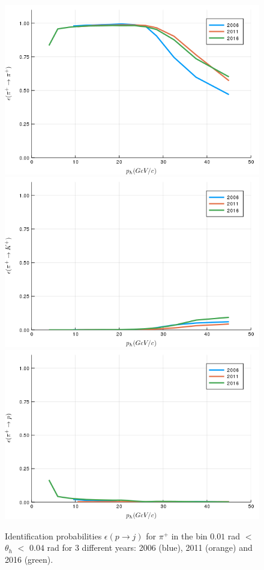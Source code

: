 \begin{figure}[!h]
  \centering
	\includegraphics[scale=0.35]{./gfx/t1/pip2pip.png}
  \includegraphics[scale=0.35]{./gfx/t1/pip2kp.png}
  \includegraphics[scale=0.35]{./gfx/t1/pip2pp.png}
	\caption{Identification probabilities $\epsilon(p \rightarrow j)$ for $\pi^+$ in the bin $0.01$ rad $<$ $\theta_h$ $<$ $0.04$ rad for 3 different years: 2006 (blue), 2011 (orange) and 2016 (green).}
	\label{pic:comppip}
\end{figure}

